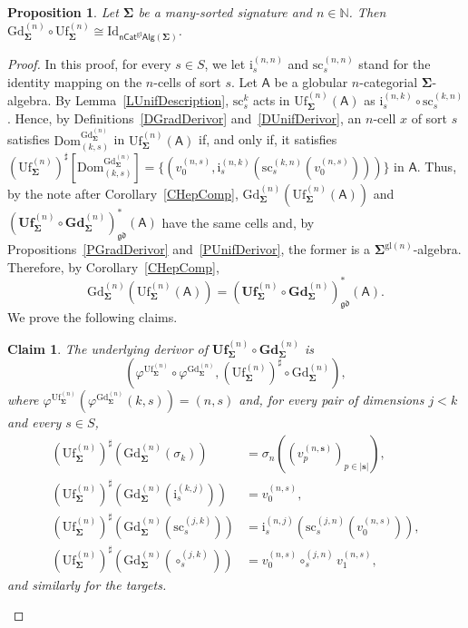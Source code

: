 \documentclass[a4paper, reqno
]{amsart}
\newcommand{\bb}[1]{\ensuremath{\lvert #1 \rvert}}
\newcommand{\sig}[1]{\mathbf{#1}}             %
\newcommand{\calg}[1]{\boldsymbol{\mathsf{#1}}} %
\newcommand{\Dom}{\mathrm{Dom}}
\newcommand{\Id}{\mathrm{Id}}
\newcommand{\gd}{\mathfrak{gd}}              %
\newcommand{\gl}{\mathrm{gl}}                %
\newcommand{\src}{\mathrm{sc}}
\newcommand{\Gd}{\mathrm{Gd}}
\newcommand{\Uf}{\mathrm{Uf}}
\newcommand{\bGd}{\mathbf{Gd}}
\newcommand{\bUf}{\mathbf{Uf}}
\theoremstyle{plain}
\newtheorem{proposition}[theorem]{Proposition}
\newtheorem{claim}[theorem]{Claim}
\theoremstyle{definition}
\begin{document}
\begin{proposition}\label{PGradUnif}
Let $\sig{\Sigma}$ be a many-sorted signature and $n\in\mathbb{N}$.
Then $\Gd^{(n)}_{\sig{\Sigma}}\circ\Uf^{(n)}_{\sig{\Sigma}}\cong \Id_{\mathsf{nCat}^{\gl}\mathsf{Alg}(\sig{\Sigma})}$.
\end{proposition}
\begin{proof}
In this proof, for every $s\in S$, we let $\mathrm{i}^{(n,n)}_{s}$ and $\src^{(n,n)}_{s}$ stand for the identity mapping on the $n$-cells of sort $s$.
Let $\calg{A}$ be a globular $n$-categorial $\sig{\Sigma}$-algebra.
By Lemma~\ref{LUnifDescription}, $\src^{k}_{s}$ acts in $\Uf^{(n)}_{\sig{\Sigma}}(\calg{A})$ as $\mathrm{i}^{(n,k)}_{s}\circ\src^{(k,n)}_{s}$.
Hence, by Definitions~\ref{DGradDerivor} and~\ref{DUnifDerivor}, an $n$-cell $x$ of sort $s$ satisfies $\Dom^{\Gd^{(n)}_{\sig{\Sigma}}}_{(k,s)}$ in $\Uf^{(n)}_{\sig{\Sigma}}(\calg{A})$ if, and only if, it satisfies $(\Uf^{(n)}_{\sig{\Sigma}})^{\sharp}[\Dom^{\Gd^{(n)}_{\sig{\Sigma}}}_{(k,s)}]=\{(v^{(n,s)}_{0},\mathrm{i}^{(n,k)}_{s}(\src^{(k,n)}_{s}(v^{(n,s)}_{0})))\}$ in $\calg{A}$.
Thus, by the note after Corollary~\ref{CHepComp}, $\Gd^{(n)}_{\sig{\Sigma}}(\Uf^{(n)}_{\sig{\Sigma}}(\calg{A}))$ and $(\bUf^{(n)}_{\sig{\Sigma}}\circ\bGd^{(n)}_{\sig{\Sigma}})^{\ast}_{\gd}(\calg{A})$ have the same cells and, by Propositions~\ref{PGradDerivor} and~\ref{PUnifDerivor}, the former is a $\sig{\Sigma}^{\gl(n)}$-algebra.
Therefore, by Corollary~\ref{CHepComp},
$$
\Gd^{(n)}_{\sig{\Sigma}}\left(\Uf^{(n)}_{\sig{\Sigma}}(\calg{A})\right)=\left(\bUf^{(n)}_{\sig{\Sigma}}\circ\bGd^{(n)}_{\sig{\Sigma}}\right)^{\ast}_{\gd}(\calg{A}).
$$
We prove the following claims.

\begin{claim}\label{CGradUnifA}
The underlying derivor of $\bUf^{(n)}_{\sig{\Sigma}}\circ\bGd^{(n)}_{\sig{\Sigma}}$ is
$$
\left(\varphi^{\Uf^{(n)}_{\sig{\Sigma}}}\circ\varphi^{\Gd^{(n)}_{\sig{\Sigma}}},\left(\Uf^{(n)}_{\sig{\Sigma}}\right)^{\sharp}\circ\Gd^{(n)}_{\sig{\Sigma}}\right),
$$
where $\varphi^{\Uf^{(n)}_{\sig{\Sigma}}}(\varphi^{\Gd^{(n)}_{\sig{\Sigma}}}(k,s))=(n,s)$ and, for every pair of dimensions $j<k$ and every $s\in S$,
\begin{align*}
\left(\Uf^{(n)}_{\sig{\Sigma}}\right)^{\sharp}\left(\Gd^{(n)}_{\sig{\Sigma}}(\sigma_{k})\right)&=\sigma_{n}((v^{(n,\mathbf{s})}_{p})_{p\in\bb{\mathbf{s}}}),\\
\left(\Uf^{(n)}_{\sig{\Sigma}}\right)^{\sharp}\left(\Gd^{(n)}_{\sig{\Sigma}}(\mathrm{i}^{(k,j)}_{s})\right)&=v^{(n,s)}_{0},\\
\left(\Uf^{(n)}_{\sig{\Sigma}}\right)^{\sharp}\left(\Gd^{(n)}_{\sig{\Sigma}}(\src^{(j,k)}_{s})\right)&=\mathrm{i}^{(n,j)}_{s}(\src^{(j,n)}_{s}(v^{(n,s)}_{0})),\\
\left(\Uf^{(n)}_{\sig{\Sigma}}\right)^{\sharp}\left(\Gd^{(n)}_{\sig{\Sigma}}(\circ^{(j,k)}_{s})\right)&=v^{(n,s)}_{0}\circ^{(j,n)}_{s}v^{(n,s)}_{1},
\end{align*}
and similarly for the targets.
\end{claim}


\end{proof}
\end{document}
